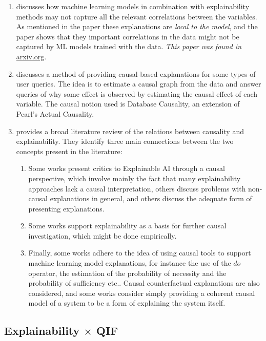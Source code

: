 \begin{enumerate}
\item \cite{vowels2022trying} discusses how machine learning models in combination with explainability methods may not capture all the relevant correlations between the variables. As mentioned in the paper these explanations are \emph{local to the model}, and the paper shows that they important correlations in the data might not be captured by ML models trained with the data. \emph{This paper was found in }\url{arxiv.org}.
\item \cite{ma2023xinsight} discusses a method of providing causal-based explanations for some types of user queries. The idea is to estimate a causal graph from the data and answer queries of why some effect is observed by estimating the causal effect of each variable. The causal notion used is Database Causality, an extension of Pearl's Actual Causality.
\item \cite{carloni2023role} provides a broad literature review of the relations between causality and explainability. They identify three main connections between the two concepts present in the literature: \begin{enumerate}
    \item Some works present critics to Explainable AI through a causal perspective, which involve mainly the fact that many explainability approaches lack a causal interpretation, others discuss problems with non-causal explanations in general, and others discuss the adequate form of presenting explanations.
    \item Some works support explainability as a basis for further causal investigation, which might be done empirically.
    \item Finally, some works adhere to the idea of using causal tools to support machine learning model explanations, for instance the use of the $do$ operator, the estimation of the probability of necessity and the probability of sufficiency etc.. Causal counterfactual explanations are also considered, and some works consider simply providing a coherent causal model of a system to be a form of explaining the system itself.
    \end{enumerate}
\end{enumerate}

\subsection{Explainability $\times$ QIF}

